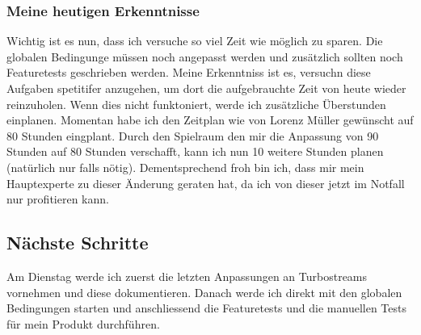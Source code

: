 \subsubsection*{Meine heutigen Erkenntnisse}
Wichtig ist es nun, dass ich versuche so viel Zeit wie möglich zu sparen. Die globalen Bedingunge müssen noch angepasst werden und
zusätzlich sollten noch Featuretests geschrieben werden. Meine Erkenntniss ist es, versuchn diese Aufgaben spetitifer anzugehen, um dort die 
aufgebrauchte Zeit von heute wieder reinzuholen. Wenn dies nicht funktoniert, werde ich zusätzliche Überstunden einplanen. Momentan habe ich den Zeitplan
wie von Lorenz Müller gewünscht auf 80 Stunden eingplant. Durch den Spielraum den mir die Anpassung von 90 Stunden auf 80 Stunden verschafft, kann ich
nun 10 weitere Stunden planen (natürlich nur falls nötig). Dementsprechend froh bin ich, dass mir mein Hauptexperte zu dieser Änderung geraten hat, 
da ich von dieser jetzt im Notfall nur profitieren kann.

\subsection*{Nächste Schritte}
Am Dienstag werde ich zuerst die letzten Anpassungen an Turbostreams vornehmen und diese dokumentieren. Danach
werde ich direkt mit den globalen Bedingungen starten und anschliessend die Featuretests und die manuellen Tests für mein
Produkt durchführen.

\pagebreak
